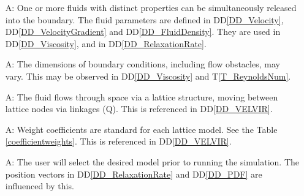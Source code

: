 \documentclass[12pt]{article}
\newcommand{\tref}[1]{T\ref{#1}}
\newcounter{assumpnum} %
\begin{document}
\begin{itemize}

\item[A\refstepcounter{assumpnum}\theassumpnum \label{A_fluids}:]
  One or more fluids with distinct properties can be simultaneously released into the boundary. The fluid parameters are defined in
  DD\ref{DD_Velocity}, DD\ref{DD_VelocityGradient} and DD\ref{DD_FluidDensity}. They are used in
  DD\ref{DD_Viscosity}, and in DD\ref{DD_RelaxationRate}.
  
\item[A\refstepcounter{assumpnum}\theassumpnum \label{A_flowObject}:]
  The dimensions of boundary conditions, including flow obstacles, may vary. This may be observed in DD\ref{DD_Viscosity} and \tref{T_ReynoldsNum}. %
  
\item[A\refstepcounter{assumpnum}\theassumpnum \label{A_lattice}:]
  The fluid flows through space via a lattice structure, moving between lattice
  nodes via linkages ($\mathrm{Q}$). This is referenced in DD\ref{DD_VELVIR}.

  
\item[A\refstepcounter{assumpnum}\theassumpnum \label{A_weightCoefficients}:]
  Weight coefficients are standard for each lattice model. See the Table
  \ref{coefficientweights}. This is referenced in DD\ref{DD_VELVIR}.

\item[A\refstepcounter{assumpnum}\theassumpnum \label{A_selectModel}:] The user
  will select the desired model prior to running the simulation. The position
  vectors in DD\ref{DD_RelaxationRate} and DD\ref{DD_PDF} are influenced by this.

\end{itemize}
\end{document}

